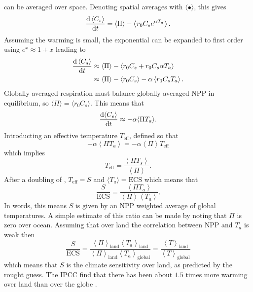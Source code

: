  can be averaged over space. Denoting spatial averages with $\langle \bullet \rangle$, this gives
\begin{equation}
  \label{eq:spatially_averaged_soil_carbon}
  \dv{\left\langle C_s\right\rangle}{t} = \left\langle \Pi \right \rangle - \left\langle r_0 C_s e^{\alpha T_a} \right \rangle.
\end{equation}
Assuming the warming is small, the exponential can be expanded to first order using $e^x \approx 1 + x$ leading to
\begin{align*}
  \dv{\left\langle C_s\right\rangle}{t} &\approx \left\langle \Pi \right \rangle - \left\langle r_0 C_s + r_0 C_s \alpha T_a \right \rangle \\
                                        &\approx \left\langle \Pi \right \rangle - \left\langle r_0 C_s\right \rangle - \alpha \left \langle r_0C_s T_a\right\rangle.
\end{align*}
Globally averaged respiration must balance globally averaged NPP in equilibrium, so $\langle \Pi \rangle = \langle r_0 C_s \rangle$. This means that
\begin{equation}
  \label{eq:soil_carbon_linearised}
  \dv{\langle C_s\rangle}{t} \approx -\alpha \langle \Pi T_a \rangle.
\end{equation}
Introducting an effective temperature $T_{\mathrm{eff}}$, defined so that
\begin{equation}
  \label{eq:motivation_of_effective_temperature}
  - \alpha \left \langle \Pi T_a \right\rangle = - \alpha \left \langle \Pi \right\rangle T_{\mathrm{eff}}
\end{equation}
which implies
\begin{equation}
  \label{eq:definition_of_effective_temperature}
  T_{\mathrm{eff}} = \frac{\left \langle \Pi T_s \right\rangle}{\left \langle \Pi \right\rangle}.
\end{equation}
After a doubling of , $T_{\mathrm{eff}} = S$ and $\langle T_a \rangle = \mathrm{ECS}$ which means that
\begin{equation}
  \label{eq:S_vs_ECS}
  \frac{S}{\mathrm{ECS}} = \frac{\left \langle \Pi T_a \right\rangle}{\left \langle \Pi \right\rangle \left \langle T_a \right \rangle}.
\end{equation}
In words, this means $S$ is given by an NPP weighted average of global temperatures. A simple estimate of this ratio can be made by noting that $\Pi$ is zero over ocean.
Assuming that over land the correlation between NPP and $T_a$ is weak then
\begin{equation}
  \label{eq:S_vs_ECS_land_ocean}
  \frac{S}{\mathrm{ECS}}
  = \frac{\left\langle \Pi\right\rangle_{\mathrm{land}} \left\langle T_a \right\rangle_{\mathrm{land}}}{\left \langle \Pi \right\rangle_{\mathrm{land}} \left \langle T_a \right \rangle_{\mathrm{global}}}
  = \frac{\left\langle T\right\rangle_{\mathrm{land}}}{\left\langle T \right\rangle_{\mathrm{global}}}
\end{equation}
which means that $S$ is the climate sensitivity over land, as predicted by the rought guess. The IPCC find that there has been about $1.5$ times more warming over land than over the globe
\parencite{AR6}.


